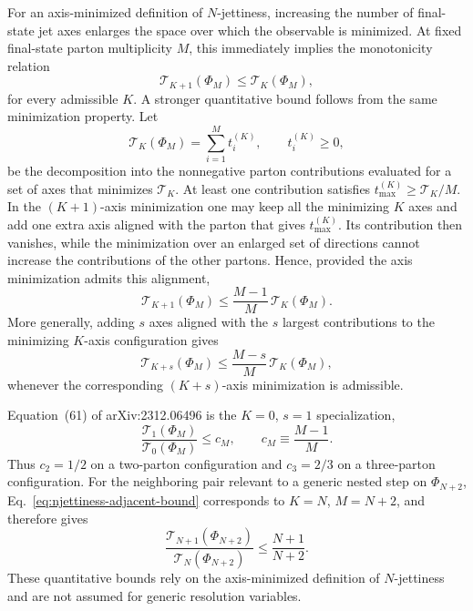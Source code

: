 \documentclass[11pt]{article}
\newcommand{\Ph}{\Phi}
\begin{document}
For an axis-minimized definition of \(N\)-jettiness, increasing the number of final-state jet axes enlarges
the space over which the observable is minimized. At fixed final-state parton multiplicity \(M\), this
immediately implies the monotonicity relation
\begin{equation}
\mathcal T_{K+1}(\Ph_M)
\le
\mathcal T_K(\Ph_M),
\label{eq:njettiness-monotonicity}
\end{equation}
for every admissible \(K\). A stronger quantitative bound follows from the same minimization property.
Let
\begin{equation}
\mathcal T_K(\Ph_M)
=
\sum_{i=1}^{M} t_i^{(K)},
\qquad
t_i^{(K)}\ge0,
\label{eq:njettiness-parton-contributions}
\end{equation}
be the decomposition into the nonnegative parton contributions evaluated for a set of axes that minimizes
\(\mathcal T_K\). At least one contribution satisfies
\(t_{\max}^{(K)}\ge \mathcal T_K/M\). In the \((K+1)\)-axis minimization one may keep all the minimizing
\(K\) axes and add one extra axis aligned with the parton that gives \(t_{\max}^{(K)}\). Its contribution
then vanishes, while the minimization over an enlarged set of directions cannot increase the contributions
of the other partons. Hence, provided the axis minimization admits this alignment,
\begin{equation}
\boxed{
\mathcal T_{K+1}(\Ph_M)
\le
\frac{M-1}{M}\,
\mathcal T_K(\Ph_M)
}.
\label{eq:njettiness-adjacent-bound}
\end{equation}
More generally, adding \(s\) axes aligned with the \(s\) largest contributions to the minimizing
\(K\)-axis configuration gives
\begin{equation}
\mathcal T_{K+s}(\Ph_M)
\le
\frac{M-s}{M}\,
\mathcal T_K(\Ph_M),
\label{eq:njettiness-multiaxis-bound}
\end{equation}
whenever the corresponding \((K+s)\)-axis minimization is admissible.

Equation~(61) of arXiv:2312.06496 is the \(K=0\), \(s=1\) specialization,
\begin{equation}
\frac{\mathcal T_1(\Ph_M)}{\mathcal T_0(\Ph_M)}
\le
c_M,
\qquad
c_M\equiv\frac{M-1}{M}.
\label{eq:t1-t0-multiplicity-bound}
\end{equation}
Thus \(c_2=1/2\) on a two-parton configuration and \(c_3=2/3\) on a three-parton configuration. For the
neighboring pair relevant to a generic nested step on \(\Ph_{N+2}\), Eq.~\eqref{eq:njettiness-adjacent-bound}
corresponds to \(K=N\), \(M=N+2\), and therefore gives
\begin{equation}
\frac{\mathcal T_{N+1}(\Ph_{N+2})}
{\mathcal T_N(\Ph_{N+2})}
\le
\frac{N+1}{N+2}.
\label{eq:njettiness-nested-pair-bound}
\end{equation}
These quantitative bounds rely on the axis-minimized definition of \(N\)-jettiness and are not assumed for
generic resolution variables.
\end{document}
